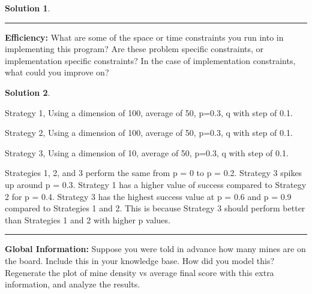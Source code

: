 \documentclass{article}
\theoremstyle{definition}
\def\fline{\rule{0.75\linewidth}{0.5pt}}
\newcommand{\finishline}{\vspace{-15pt}\begin{center}\fline\end{center}}
\newtheorem*{solution*}{Solution}
\newenvironment{solution}{\begin{solution*}}{{\finishline} \end{solution*}}
\begin{document}
\begin{solution}
\end{solution}

\smallskip

\textbf{Efficiency: }
What are some of the space or time constraints you run into in implementing this program? 
Are these problem specific constraints, or implementation specific constraints? 
In the case of implementation constraints, what could you improve on?


\smallskip

\begin{solution} \hfill
    \begin{figure}[h]
	\centering
	\caption{} 
	\end{figure} 
	\begin{center}
	Strategy 1, Using a dimension of 100, average of 50, p=0.3, q with step of 0.1.
	
	Strategy 2, Using a dimension of 100, average of 50, p=0.3, q with step of 0.1.
	
	Strategy 3, Using a dimension of 10, average of 50, p=0.3, q with step of 0.1. 
    \end{center}
    
    Strategies 1, 2, and 3 perform the same from p = 0 to p = 0.2. Strategy 3 spikes up around p = 0.3. Strategy 1 has a higher value of success compared to Strategy 2 for p = 0.4. Strategy 3 has the highest success value at p = 0.6 and p = 0.9 compared to Strategies 1 and 2. This is because Strategy 3 should perform better than Strategies 1 and 2 with higher p values.
\end{solution}
\smallskip

\textbf{Global Information: }
	Suppose you were told in advance how many mines are on the board. Include this in your knowledge base. How did you model this? Regenerate the plot of mine density vs average final score with this extra information, and analyze the results.


\smallskip
\end{document}
